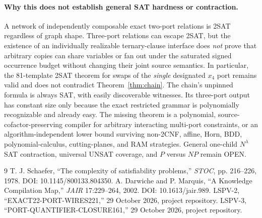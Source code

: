 \documentclass[11pt]{article}
\begin{document}
\paragraph{Why this does not establish general SAT hardness or contraction.}
A network of independently composable exact two-port relations is 2SAT regardless of graph shape. Three-port relations can escape 2SAT, but the existence of an individually realizable ternary-clause interface does \emph{not} prove that arbitrary copies can share variables or fan out under the saturated signed occurrence budget without changing their joint source semantics. In particular, the 81-template 2SAT theorem for swaps of the \emph{single} designated $x_4$ port remains valid and does not contradict Theorem~\ref{thm:chain}. The chain's unpinned formula is always SAT, with easily discoverable witnesses. Its three-port output has constant size only because the exact restricted grammar is polynomially recognizable and already easy. The missing theorem is a polynomial, source-cofactor-preserving compiler for arbitrary interacting multi-port constraints, or an algorithm-independent lower bound surviving non-2CNF, affine, Horn, BDD, polynomial-calculus, cutting-planes, and RAM strategies. General one-child $N^\lambda$ SAT contraction, universal UNSAT coverage, and $P$ versus $NP$ remain OPEN.

\begin{thebibliography}{9}
 T. J. Schaefer, ``The complexity of satisfiability problems,'' \emph{STOC}, pp. 216--226, 1978. DOI: 10.1145/800133.804350.
 A. Darwiche and P. Marquis, ``A Knowledge Compilation Map,'' \emph{JAIR} 17:229--264, 2002. DOI: 10.1613/jair.989.
 LSPV-2, ``EXACT22-PORT-WIRES221,'' 29 October 2026, project repository.
 LSPV-3, ``PORT-QUANTIFIER-CLOSURE161,'' 29 October 2026, project repository.
\end{thebibliography}
\end{document}
